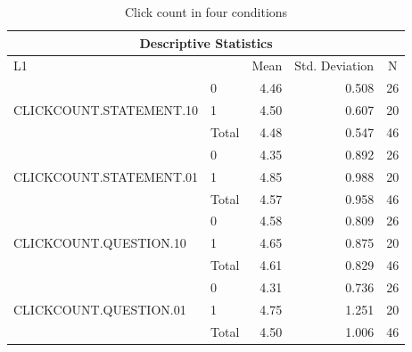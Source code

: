 \documentclass[a4paper]{article}
\begin{document}
\begin{table}[H]
\begin{center}
\caption{Click count in four conditions}
\label{tab:descriptiveclickcount}
\begin{tabular}{|l|l|r|r|r|} 
\hline
\multicolumn{5}{|c|}{Descriptive Statistics}                                                                                                 \\ 
\hline
L1                                       &       & \multicolumn{1}{c|}{Mean} & \multicolumn{1}{c|}{Std. Deviation} & \multicolumn{1}{c|}{N}  \\ 
\hline
\multirow{3}{*}{CLICKCOUNT.STATEMENT.10} & 0     & 4.46                      & 0.508                               & 26                      \\ 
\cline{2-5}
                                         & 1     & 4.50                      & 0.607                               & 20                      \\ 
\cline{2-5}
                                         & Total & 4.48                      & 0.547                               & 46                      \\ 
\hline
\multirow{3}{*}{CLICKCOUNT.STATEMENT.01} & 0     & 4.35                      & 0.892                               & 26                      \\ 
\cline{2-5}
                                         & 1     & 4.85                      & 0.988                               & 20                      \\ 
\cline{2-5}
                                         & Total & 4.57                      & 0.958                               & 46                      \\ 
\hline
\multirow{3}{*}{CLICKCOUNT.QUESTION.10}  & 0     & 4.58                      & 0.809                               & 26                      \\ 
\cline{2-5}
                                         & 1     & 4.65                      & 0.875                               & 20                      \\ 
\cline{2-5}
                                         & Total & 4.61                      & 0.829                               & 46                      \\ 
\hline
\multirow{3}{*}{CLICKCOUNT.QUESTION.01}  & 0     & 4.31                      & 0.736                               & 26                      \\ 
\cline{2-5}
                                         & 1     & 4.75                      & 1.251                               & 20                      \\ 
\cline{2-5}
                                         & Total & 4.50                      & 1.006                               & 46                      \\
\hline
\end{tabular}
\end{center}
\end{table}
\end{document}
